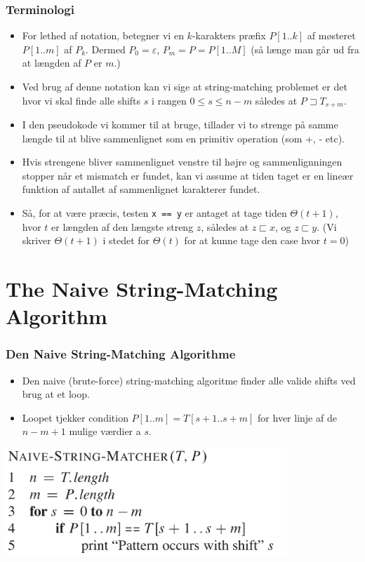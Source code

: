 \documentclass{beamer}
\begin{document}
\begin{frame}[allowframebreaks]
  \frametitle{Terminologi}
  
\begin{itemize}
\item For lethed af notation, betegner vi en $k$-karakters præfix $P[1..k]$ af møsteret $P[1..m]$ af $P_{k}$. Dermed $P_{0} = \varepsilon$, $P_{m} = P = P[1..M]$ (så længe man går ud fra at længden af $P$ er $m$.)
\item Ved brug af denne notation kan vi sige at string-matching problemet er det hvor vi skal finde alle shifts $s$ i rangen $0 \leq s \leq n -m$ således at $P \sqsupset T_{s+m}$.
\item I den pseudokode vi kommer til at bruge, tillader vi to strenge på samme længde til at blive sammenlignet som en primitiv operation (som +, - etc).
\item Hvis strengene bliver sammenlignet venstre til højre og sammenlignningen stopper når et mismatch er fundet, kan vi assume at tiden taget er en lineær funktion af antallet af sammenlignet karakterer fundet. 
\item Så, for at være præcis, testen \texttt{x == y} er antaget at tage tiden $\Theta (t+1)$, hvor $t$ er længden af den længste streng $z$, således at $z \sqsubset x$, og $z \sqsubset y$. (Vi skriver $\Theta (t+1)$ i stedet for $\Theta(t)$ for at kunne tage den case hvor $t = 0$)
\end{itemize}
\end{frame}

\section{The Naive String-Matching Algorithm}
\label{sec:label}


\begin{frame}
  \frametitle{Den Naive String-Matching Algorithme}
  \begin{itemize}
  \item Den naive (brute-force) string-matching algoritme finder alle valide shifts ved brug at et loop. 
  \item Loopet tjekker condition $P[1..m] = T[s+1 .. s+m]$ for hver linje af de $n-m+1$ mulige værdier a $s$. 
  \end{itemize}
  
  \includegraphics[width=300pt]{main--the-naive-string-matching-algorithm-3b93.png}
\end{frame}
\end{document}
